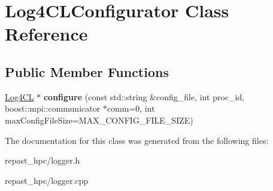 \hypertarget{class_log4_c_l_configurator}{\section{Log4\-C\-L\-Configurator Class Reference}
\label{class_log4_c_l_configurator}
}
\subsection*{Public Member Functions}
\begin{DoxyCompactItemize}
\item 
\hypertarget{class_log4_c_l_configurator_a3a3027bf647a1ee2e3103a36cf59cbf5}{\hyperlink{class_log4_c_l}{Log4\-C\-L} $\ast$ {\bfseries configure} (const std\-::string \&config\-\_\-file, int proc\-\_\-id, boost\-::mpi\-::communicator $\ast$comm=0, int max\-Config\-File\-Size=M\-A\-X\-\_\-\-C\-O\-N\-F\-I\-G\-\_\-\-F\-I\-L\-E\-\_\-\-S\-I\-Z\-E)}\label{class_log4_c_l_configurator_a3a3027bf647a1ee2e3103a36cf59cbf5}

\end{DoxyCompactItemize}


The documentation for this class was generated from the following files\-:\begin{DoxyCompactItemize}
\item 
repast\-\_\-hpc/logger.\-h\item 
repast\-\_\-hpc/logger.\-cpp\end{DoxyCompactItemize}
